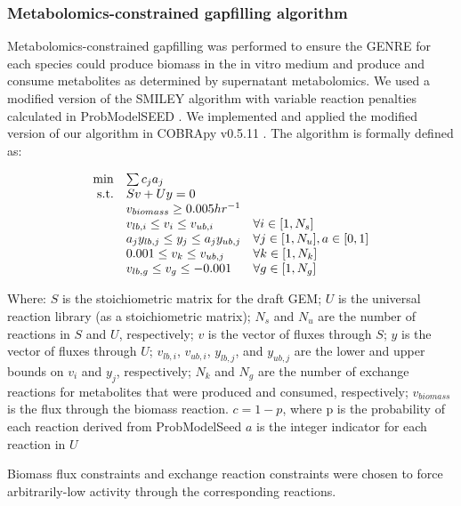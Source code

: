 \documentclass[11pt,onecolumn,notitlepage,openany,twoside]{book}
\begin{document}
\begin{refsection}
\subsubsection{Metabolomics-constrained gapfilling algorithm}

Metabolomics-constrained gapfilling was performed to ensure the GENRE for each species could produce biomass in the in vitro medium and produce and consume metabolites as determined by supernatant metabolomics. We used a modified version of the SMILEY algorithm \cite{Reed2006-qv} with variable reaction penalties calculated in ProbModelSEED \cite{Benedict2014-yo}. We implemented and applied the modified version of our algorithm in COBRApy v0.5.11 \cite{Ebrahim2013-eb}. The algorithm is formally defined as:

\begin{equation*}
\begin{array}{rlll}
\min & \multicolumn{2}{l} {\sum c_{j}a_{j} } \\
\textrm{s.t.} &	Sv + Uy = 0	 \\
&	v_{biomass} \geq 0.005 hr^{-1} \\
&	v_{lb,i} \leq v_i \leq v_{ub,i}	& 	\forall i \in [1, N_s] \\
&	a_{j}y_{lb,j} \leq y_j \leq a_{j}y_{ub,j}	&	\forall j \in [1, N_u], a \in{[0,1]} \\
&	0.001 \leq v_k \leq v_{ub,j}	&	\forall k \in [1, N_k] \\
&	v_{lb,g} \leq v_g \leq -0.001	&	\forall g \in [1, N_g] \\
\end{array}
\end{equation*}

Where:
  $S$ is the stoichiometric matrix for the draft GEM;
	$U$ is the universal reaction library (as a stoichiometric matrix);
	$N_s$ and $N_u$ are the number of reactions in $S$ and $U$, respectively;
	$v$ is the vector of fluxes through $S$;
 	$y$ is the vector of fluxes through $U$;
	$v_{lb,i}$, $v_{ub,i}$, $y_{lb,j}$, and $y_{ub,j}$ are the lower and upper bounds on $v_i$ and $y_j$, respectively;
  $N_k$ and $N_g$ are the number of exchange reactions for metabolites that were produced and consumed, respectively;
	$v_{biomass}$ is the flux through the biomass reaction.
  $c = 1 - p$, where p is the probability of each reaction derived from ProbModelSeed
  $a$ is the integer indicator for each reaction in $U$

Biomass flux constraints and exchange reaction constraints were chosen to force arbitrarily-low activity through the corresponding reactions.


\end{refsection}
\end{document}
